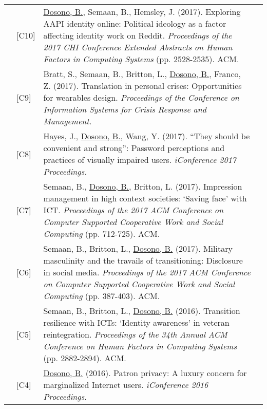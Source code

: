 \documentclass[12pt]{article}
\begin{document}
{{\begin{longtable}{Rp{1.0in}p{0.25in}p{4.75in}}
& \footnotesize{[C10]} & \href{http://dl.acm.org/authorize?N41342}{{Dosono, B.}}, Semaan, B., Hemsley, J. (2017). Exploring AAPI identity online: Political ideology as a factor affecting identity work on Reddit. \textit{Proceedings of the 2017 CHI Conference Extended Abstracts on Human Factors in Computing Systems }(pp. 2528-2535). ACM. \\

& \footnotesize{[C9]} & Bratt, S., Semaan, B., Britton, L., \href{http://idl.iscram.org/files/sarahbratt/2017/1463\_SarahBratt\_etal2017.pdf}{{Dosono, B.}}, Franco, Z. (2017). Translation in personal crises: Opportunities for wearables design. \textit{Proceedings of the Conference on Information Systems for Crisis Response and Management.} \\

& \footnotesize{[C8]} & Hayes, J., \href{http://hdl.handle.net/2142/96755}{{Dosono, B.}}, Wang, Y. (2017). ``They should be convenient and strong'': Password perceptions and practices of visually impaired users. \textit{iConference 2017 Proceedings.} \\

& \footnotesize{[C7]} & Semaan, B., \href{http://dl.acm.org/authorize?N41343}{{Dosono, B.}}, Britton, L. (2017). Impression management in high context societies: ‘Saving face’ with ICT. \textit{Proceedings of the 2017 ACM Conference on Computer Supported Cooperative Work and Social Computing} (pp. 712-725). ACM. \\

& \footnotesize{[C6]} & Semaan, B., Britton, L., \href{http://dl.acm.org/authorize?N41344}{{Dosono, B.}} (2017). Military masculinity and the travails of transitioning: Disclosure in social media. \textit{Proceedings of the 2017 ACM Conference on Computer Supported Cooperative Work and Social Computing} (pp. 387-403). ACM. \\

& \footnotesize{[C5]} & Semaan, B., Britton, L., \href{http://dl.acm.org/authorize?N41455}{{Dosono, B.}} (2016). Transition resilience with ICTs: ‘Identity awareness’ in veteran reintegration. \textit{Proceedings of the 34th Annual ACM Conference on Human Factors in Computing Systems} (pp. 2882-2894). ACM. \\

& \footnotesize{[C4]} & \href{http://hdl.handle.net/2142/89438}{{Dosono, B.}} (2016). Patron privacy: A luxury concern for marginalized Internet users.\textit{ iConference 2016 Proceedings}. \\


\end{longtable}}}
\end{document}
